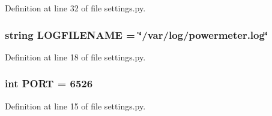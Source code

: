 \-Definition at line 32 of file settings.\-py.

\hypertarget{namespacesettings_ad8b24d8c3b310fdb6f379762c51c07dc}{
\subsubsection[{\-L\-O\-G\-F\-I\-L\-E\-N\-A\-M\-E}]{\setlength{\rightskip}{0pt plus 5cm}string {\bf \-L\-O\-G\-F\-I\-L\-E\-N\-A\-M\-E} = \char`\"{}/var/log/powermeter.\-log\char`\"{}}}\label{namespacesettings_ad8b24d8c3b310fdb6f379762c51c07dc}


\-Definition at line 18 of file settings.\-py.

\hypertarget{namespacesettings_a78dc8eaa9905715367e9beb76bf4b5f7}{
\subsubsection[{\-P\-O\-R\-T}]{\setlength{\rightskip}{0pt plus 5cm}int {\bf \-P\-O\-R\-T} = 6526}}\label{namespacesettings_a78dc8eaa9905715367e9beb76bf4b5f7}


\-Definition at line 15 of file settings.\-py.

